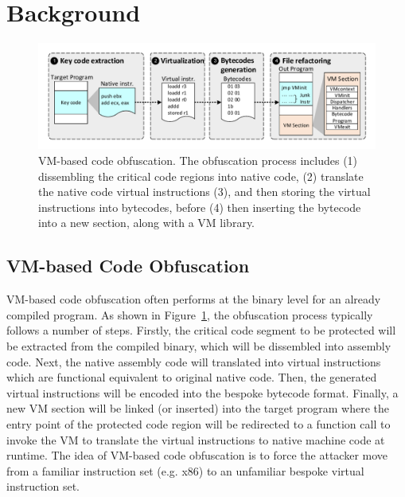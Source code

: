 \section{Background}\label{sec:bak}

\begin{figure}[t]%
    \centering
    \includegraphics[width=1\columnwidth]{figure/figvmp.pdf}
    \caption{VM-based code obfuscation. The obfuscation process includes (1) dissembling the critical code regions into native code, (2) translate the native code virtual instructions (3), and then storing the virtual instructions into bytecodes, before (4) then inserting the bytecode into a new section, along with a VM library.}\label{fig:Fig.vmp}
\end{figure}

\subsection{VM-based Code Obfuscation}
VM-based code obfuscation often performs at the binary level for an already
compiled program. As shown in Figure~\ref{fig:Fig.vmp}, the obfuscation process typically follows a number of steps.
Firstly, the critical code segment to be protected will be extracted from the compiled
binary, which will be dissembled into assembly code. Next, the native
assembly code will translated into virtual instructions which are functional
equivalent to original native code. Then, the
generated virtual instructions will be encoded into the bespoke bytecode
format.  Finally, a new VM section will be linked (or inserted) into the
target program where the entry point of the protected code region will be
redirected to a function call to invoke the VM to translate the virtual
instructions to native machine code at runtime. The idea of VM-based code
obfuscation is to force the attacker move from a familiar
instruction set (e.g. x86) to an unfamiliar bespoke virtual instruction set.


